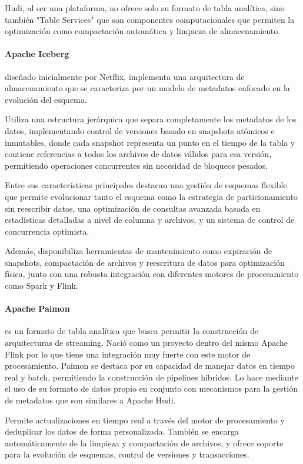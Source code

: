 Hudi, al ser una plataforma, no ofrece solo su formato de tabla analítica, 
sino también "Table Services" que son componentes computacionales que permiten la optimización como compactación automática 
y limpieza de almacenamiento. 

\newpage
\paragraph{Apache Iceberg}diseñado inicialmente por Netflix, implementa una arquitectura de almacenamiento que se caracteriza 
por un modelo de metadatos enfocado en la evolución del esquema. 

Utiliza una estructura jerárquica que separa completamente los metadatos de los datos, 
implementando control de versiones basado en snapshots atómicos e inmutables, 
donde cada snapshot representa un punto en el tiempo de la tabla y contiene referencias a todos los archivos de datos válidos para esa versión, 
permitiendo operaciones concurrentes sin necesidad de bloqueos pesados.

Entre sus características principales destacan una gestión de esquemas flexible que permite evolucionar tanto el esquema 
como la estrategia de particionamiento sin reescribir datos, 
una optimización de consultas avanzada basada en estadísticas detalladas a nivel de columna y archivos, 
y un sistema de control de concurrencia optimista. 

Además, disponibiliza herramientas de mantenimiento como expiración de snapshots, compactación de archivos 
y reescritura de datos para optimización física, 
junto con una robusta integración con diferentes motores de procesamiento como Spark y Flink.

\newpage
\paragraph{Apache Paimon} es un formato de tabla analítica que busca permitir la construcción de arquitecturas de streaming.
Nació como un proyecto dentro del mismo Apache Flink por lo que tiene una integración muy fuerte con este motor de procesamiento.
Paimon se destaca por su capacidad de manejar datos en tiempo real y batch, permitiendo la construcción de pipelines híbridos.
Lo hace mediante el uso de su formato de datos propio en conjunto con mecanismos para la gestión de metadatos que son 
similares a Apache Hudi.

Permite actualizaciones en tiempo real a través del motor de procesamiento y deduplicar los datos de forma personalizada. 
También se encarga automáticamente de la limpieza y compactación de archivos, 
y ofrece soporte para la evolución de esquemas, control de versiones y transacciones.

